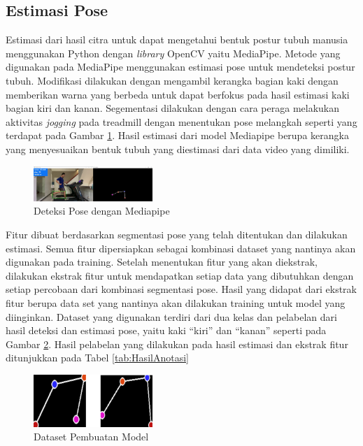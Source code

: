 \subsection{Estimasi Pose}
\label{subsec:EstimasiPose}

Estimasi dari hasil citra untuk dapat mengetahui bentuk postur tubuh manusia menggunakan Python dengan \emph{library} OpenCV yaitu MediaPipe. Metode yang digunakan pada MediaPipe menggunakan estimasi pose untuk mendeteksi postur tubuh. Modifikasi dilakukan dengan mengambil kerangka bagian kaki dengan memberikan warna yang berbeda untuk dapat berfokus pada hasil estimasi kaki bagian kiri dan kanan. Segementasi dilakukan dengan cara peraga melakukan aktivitas \emph{jogging} pada treadmill dengan menentukan pose melangkah seperti yang terdapat pada Gambar \ref{fig:EstimasiPose}. Hasil estimasi dari model Mediapipe berupa kerangka yang menyesuaikan bentuk tubuh yang diestimasi dari data video yang dimiliki.

\begin{figure} [ht]
  \centering
  \includegraphics[width=0.4\textwidth]{gambar/deteksi pose.png}
  \caption{Deteksi Pose dengan Mediapipe}
  \label{fig:EstimasiPose}
\end{figure}

Fitur dibuat berdasarkan segmentasi pose yang telah ditentukan dan dilakukan estimasi. Semua fitur dipersiapkan sebagai kombinasi dataset yang nantinya akan digunakan pada training. Setelah menentukan fitur yang akan diekstrak, dilakukan ekstrak fitur untuk mendapatkan setiap data yang dibutuhkan dengan setiap percobaan dari kombinasi segmentasi pose. Hasil yang didapat dari ekstrak fitur berupa data set yang nantinya akan dilakukan training untuk model yang diinginkan. Dataset yang digunakan terdiri dari dua kelas dan pelabelan dari hasil deteksi dan estimasi pose, yaitu kaki “kiri” dan “kanan” seperti pada Gambar \ref{fig:DeteksiPose2}. Hasil pelabelan yang dilakukan pada hasil estimasi dan ekstrak fitur ditunjukkan pada Tabel \ref{tab:HasilAnotasi}

\begin{figure} [ht]
  \centering
  \includegraphics[width=0.4\textwidth]{gambar/deteksi pose2.png}
  \caption{Dataset Pembuatan Model}
  \label{fig:DeteksiPose2}
\end{figure}

